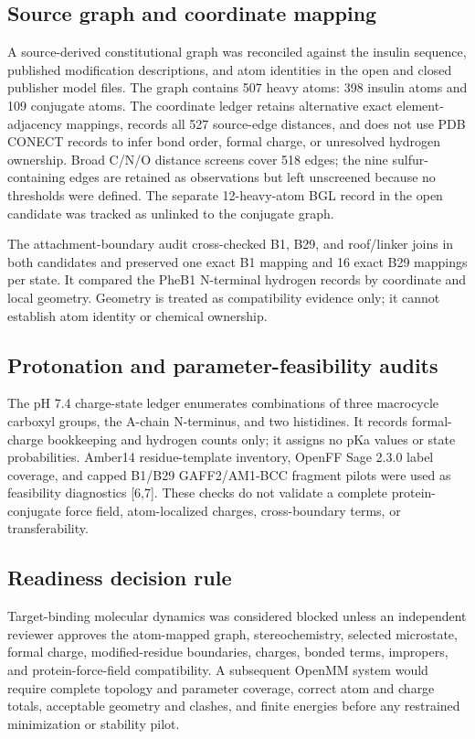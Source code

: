 \documentclass[11pt]{article}
\begin{document}
\subsection{Source graph and coordinate mapping}

A source-derived constitutional graph was reconciled against the insulin sequence, published modification descriptions, and atom identities in the open and closed publisher model files. The graph contains 507 heavy atoms: 398 insulin atoms and 109 conjugate atoms. The coordinate ledger retains alternative exact element-adjacency mappings, records all 527 source-edge distances, and does not use PDB CONECT records to infer bond order, formal charge, or unresolved hydrogen ownership. Broad C/N/O distance screens cover 518 edges; the nine sulfur-containing edges are retained as observations but left unscreened because no thresholds were defined. The separate 12-heavy-atom BGL record in the open candidate was tracked as unlinked to the conjugate graph.

The attachment-boundary audit cross-checked B1, B29, and roof/linker joins in both candidates and preserved one exact B1 mapping and 16 exact B29 mappings per state. It compared the PheB1 N-terminal hydrogen records by coordinate and local geometry. Geometry is treated as compatibility evidence only; it cannot establish atom identity or chemical ownership.

\subsection{Protonation and parameter-feasibility audits}

The pH 7.4 charge-state ledger enumerates combinations of three macrocycle carboxyl groups, the A-chain N-terminus, and two histidines. It records formal-charge bookkeeping and hydrogen counts only; it assigns no pKa values or state probabilities. Amber14 residue-template inventory, OpenFF Sage 2.3.0 label coverage, and capped B1/B29 GAFF2/AM1-BCC fragment pilots were used as feasibility diagnostics [6,7]. These checks do not validate a complete protein-conjugate force field, atom-localized charges, cross-boundary terms, or transferability.

\subsection{Readiness decision rule}

Target-binding molecular dynamics was considered blocked unless an independent reviewer approves the atom-mapped graph, stereochemistry, selected microstate, formal charge, modified-residue boundaries, charges, bonded terms, impropers, and protein-force-field compatibility. A subsequent OpenMM system would require complete topology and parameter coverage, correct atom and charge totals, acceptable geometry and clashes, and finite energies before any restrained minimization or stability pilot.
\end{document}
